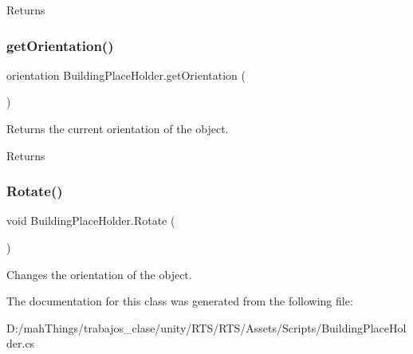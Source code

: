 \begin{DoxyReturn}{Returns}

\end{DoxyReturn}
\mbox{\label{class_building_place_holder_a2d54012f5c6a7271bd804bdb8f554312}} 
\subsubsection{\texorpdfstring{get\+Orientation()}{getOrientation()}}
{\footnotesize\ttfamily orientation Building\+Place\+Holder.\+get\+Orientation (\begin{DoxyParamCaption}{ }\end{DoxyParamCaption})}



Returns the current orientation of the object. 

\begin{DoxyReturn}{Returns}

\end{DoxyReturn}
\mbox{\label{class_building_place_holder_a693222f4af7c27b6687e3c544b4d60f0}} 
\subsubsection{\texorpdfstring{Rotate()}{Rotate()}}
{\footnotesize\ttfamily void Building\+Place\+Holder.\+Rotate (\begin{DoxyParamCaption}{ }\end{DoxyParamCaption})}



Changes the orientation of the object. 



The documentation for this class was generated from the following file\+:\begin{DoxyCompactItemize}
\item 
D\+:/mah\+Things/trabajos\+\_\+clase/unity/\+R\+T\+S/\+R\+T\+S/\+Assets/\+Scripts/Building\+Place\+Holder.\+cs\end{DoxyCompactItemize}
